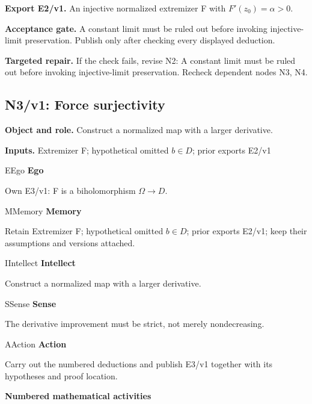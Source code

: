 \documentclass[preprint,12pt,aps,pra,showkeys,amsmath,amssymb,superscriptaddress,floatfix]{revtex4-2}
\theoremstyle{definition}
\theoremstyle{remark}
\newcommand{\mmfaculty}[3]{%
 \begin{mmfacultybox}{#1}{#2}
 {\sffamily\bfseries\color{MMBlue}#2}\par\smallskip #3
 \end{mmfacultybox}}
\newcommand{\field}[2]{\par\smallskip\noindent\textbf{#1.} #2\par}
\begin{document}
\field{Export E2/v1}{An injective normalized extremizer F with \(F'(z_{0})=\alpha >0\).}

\field{Acceptance gate}{A constant limit must be ruled out before invoking injective-limit
preservation. Publish only after checking every displayed deduction.}

\field{Targeted repair}{If the check fails, revise N2: A constant limit must be ruled out before
invoking injective-limit preservation. Recheck dependent nodes N3, N4.}

\clearpage

\subsection{N3/v1: Force surjectivity}

\field{Object and role}{Construct a normalized map with a larger derivative.}

\field{Inputs}{Extremizer F; hypothetical omitted \(b\in D\); prior exports E2/v1}

\mmfaculty{E}{Ego}{Own E3/v1: F is a biholomorphism \(\Omega \to D\).}

\mmfaculty{M}{Memory}{Retain Extremizer F; hypothetical omitted \(b\in D\); prior exports
E2/v1; keep their assumptions and versions attached.}

\mmfaculty{I}{Intellect}{Construct a normalized map with a larger derivative.}

\mmfaculty{S}{Sense}{The derivative improvement must be strict, not merely nondecreasing.}

\mmfaculty{A}{Action}{Carry out the numbered deductions and publish E3/v1 together with its
hypotheses and proof location.}

\smallskip\noindent\textbf{Numbered mathematical activities}
\end{document}
